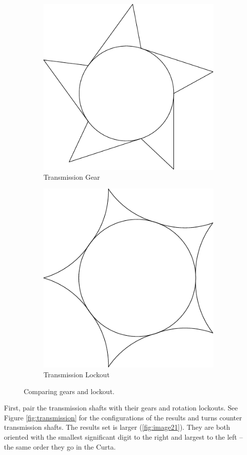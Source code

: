 \documentclass[openany]{book}
\begin{document}
\begin{figure}[!ht]
	\centering
	\begin{subfigure}{.4\textwidth}
		\centering
		\includegraphics[width=.45\textwidth]{images/transmission-gear.pdf}
		\caption{Transmission Gear}
	\end{subfigure}
	\begin{subfigure}{.4\textwidth}
		\centering
		\includegraphics[width=.45\textwidth]{images/transmission-lockout.pdf}
		\caption{Transmission Lockout}
	\end{subfigure}
	\caption{Comparing gears and lockout.}
	\label{fig:transmission:dif}
\end{figure}



First, pair the transmission shafts with their gears and rotation lockouts. See Figure \ref{fig:transmission} for the configurations of the results and turns counter transmission shafts. The results set is larger (\ref{fig:image21}). They are both oriented with the smallest significant digit to the right and largest to the left -- the same order they go in the Curta.
\end{document}
